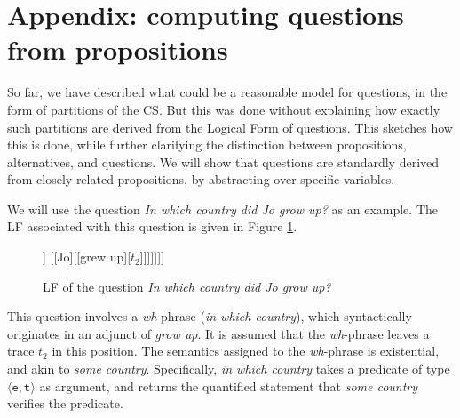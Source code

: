 %
%
%
%
% 



\section{Appendix: computing questions from propositions}\label{sec:q-derivation}

So far, we have described what could be a reasonable model for questions, in the form of partitions of the CS. But this was done without explaining how exactly such partitions are derived from the Logical Form of questions. This sketches how this is done, while further clarifying the distinction between propositions, alternatives, and questions. We will show that questions are standardly derived from closely related propositions, by abstracting over specific variables.

We will use the question \textit{In which country did Jo grow up?} as an example. The LF associated with this question is given in Figure \ref{fig1:question-lf}.

\begin{figure}[H]
	\centering
	\begin{forest}
		[\fbox{5}[$\lambda_1$][\fbox{4}[{(In which country)$_2$}] [\fbox{3}[$\lambda_2$] [\fbox{2}[[?][$t_1$]] [{}[Jo][[grew up][$t_2$]]]]]]]
	\end{forest}
	\caption{LF of the question \textit{In which country did Jo grow up?}}\label{fig1:question-lf}
\end{figure}

This question involves a \textit{wh}-phrase (\textit{in which country}), which syntactically originates in an adjunct of \textit{grow up}. It is assumed that the \textit{wh}-phrase leaves a trace $t_2$ in this position. The semantics assigned to the \textit{wh}-phrase is existential, and akin to \textit{some country}. Specifically, \textit{in which country} takes a predicate of type $\langle \texttt{e}, \texttt{t} \rangle$ as argument, and returns the quantified statement that \textit{some country} verifies the predicate.

